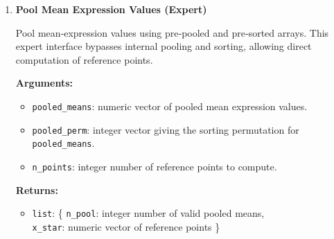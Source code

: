 \begin{enumerate}
        Pool per‑gene mean expression values from two studies and compute reference points for neighborhood construction.

        \textbf{Arguments:}
        \begin{itemize}
            \item \lstinline!mean_S1!: numeric vector of mean expression values for study 1.
            \item \lstinline!mean_S2!: numeric vector of mean expression values for study 2.
            \item \lstinline!n_points!: integer number of reference points to compute.
        \end{itemize}

        \textbf{Returns:}
        \begin{itemize}
            \item \lstinline!list!: \{
                \lstinline!n_pool!: integer number of valid pooled means,\\
                \lstinline!x_star!: numeric vector of reference points
            \}
        \end{itemize}

        \begin{lstlisting}[language=R, caption={Pooling Mean Expression Values}]
out <- tox_pool_means(mean_S1, mean_S2, n_points)

n_pool <- out$n_pool
x_star <- out$x_star
        \end{lstlisting}

    \item \textbf{Pool Mean Expression Values (Expert)}

        Pool mean‑expression values using pre‑pooled and pre‑sorted arrays.  
        This expert interface bypasses internal pooling and sorting, allowing direct computation of reference points.

        \textbf{Arguments:}
        \begin{itemize}
            \item \lstinline!pooled_means!: numeric vector of pooled mean expression values.
            \item \lstinline!pooled_perm!: integer vector giving the sorting permutation for \lstinline!pooled_means!.
            \item \lstinline!n_points!: integer number of reference points to compute.
        \end{itemize}

        \textbf{Returns:}
        \begin{itemize}
            \item \lstinline!list!: \{
                \lstinline!n_pool!: integer number of valid pooled means,\\
                \lstinline!x_star!: numeric vector of reference points
            \}
        \end{itemize}


\end{enumerate}
